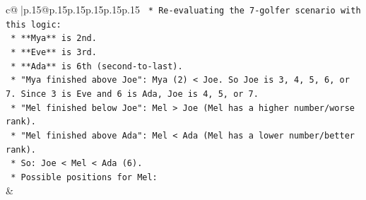 \documentclass{article}
\begin{document}
{\begin{supertabular}{c@{$\;$}|p{.15\linewidth}@{}p{.15\linewidth}p{.15\linewidth}p{.15\linewidth}p{.15\linewidth}p{.15\linewidth}}
{{{\texttt{    *   Re{-}evaluating the 7{-}golfer scenario with this logic:} \\
\texttt{        *   **Mya** is 2nd.} \\
\texttt{        *   **Eve** is 3rd.} \\
\texttt{        *   **Ada** is 6th (second{-}to{-}last).} \\
\texttt{        *   "Mya finished above Joe": Mya (2) < Joe. So Joe is 3, 4, 5, 6, or 7. Since 3 is Eve and 6 is Ada, Joe is 4, 5, or 7.} \\
\texttt{        *   "Mel finished below Joe": Mel > Joe (Mel has a higher number/worse rank).} \\
\texttt{        *   "Mel finished above Ada": Mel < Ada (Mel has a lower number/better rank).} \\
\texttt{        *   So: Joe < Mel < Ada (6).} \\
\texttt{        *   Possible positions for Mel:} \\
            }
        }
    }
    & \\ \\


\end{supertabular}}
\end{document}
